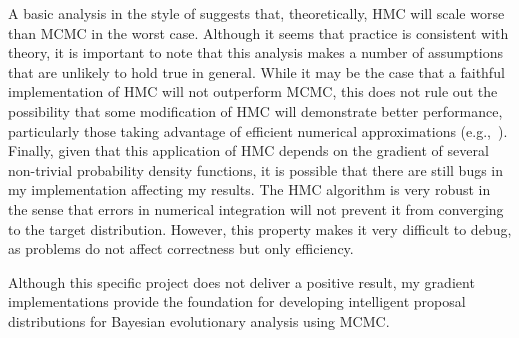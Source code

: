 \documentclass{article}
\begin{document}
    A basic analysis in the style of \textcite{Nea11} suggests that,
        theoretically, \ac{HMC} will scale worse than \ac{MCMC} in the worst
        case.
    Although it seems that practice is consistent with theory, it is important
        to note that this analysis makes a number of assumptions that are
        unlikely to hold true in general.
    While it may be the case that a faithful implementation of \ac{HMC} will
        not outperform \ac{MCMC}, this does not rule out the possibility that
        some modification of \ac{HMC} will demonstrate better performance,
        particularly those taking advantage of efficient numerical
        approximations (e.g.,~\cite{CFG14}).
    Finally, given that this application of \ac{HMC} depends on the gradient of
        several non-trivial probability density functions, it is possible that
        there are still bugs in my implementation affecting my results.
    The \ac{HMC} algorithm is very robust in the sense that errors in numerical
        integration will not prevent it from converging to the target
        distribution.
    However, this property makes it very difficult to debug, as problems do not
        affect correctness but only efficiency.

    Although this specific project does not deliver a positive result, my
        gradient implementations provide the foundation for developing
        intelligent proposal distributions for Bayesian evolutionary analysis
        using \ac{MCMC}.
\end{document}
